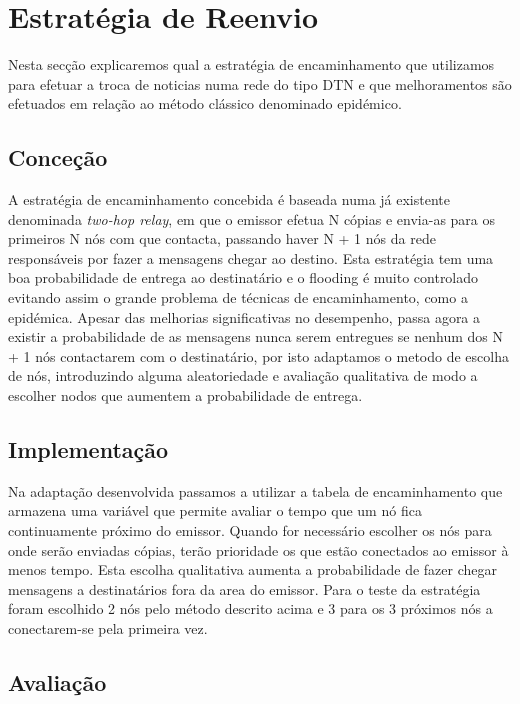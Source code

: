 \documentclass{llncs}
\begin{document}
\section{Estratégia de Reenvio}

Nesta secção explicaremos qual a estratégia de encaminhamento que utilizamos para efetuar a troca de noticias numa rede do tipo DTN e que melhoramentos são efetuados em relação ao método clássico denominado epidémico.

\subsection{Conceção}

A estratégia de encaminhamento concebida é baseada numa já existente denominada \emph{two-hop relay}, em que o emissor efetua N cópias e envia-as para os primeiros N nós com que contacta, passando haver N + 1 nós da rede responsáveis por fazer a mensagens chegar ao destino. Esta estratégia tem uma boa probabilidade de entrega ao destinatário e o flooding é muito controlado evitando assim o grande problema de técnicas de encaminhamento, como a epidémica. Apesar das melhorias significativas no desempenho, passa agora a existir a probabilidade de as mensagens nunca serem entregues se nenhum dos N + 1 nós contactarem com o destinatário, por isto adaptamos o metodo de escolha de nós, introduzindo alguma aleatoriedade e avaliação qualitativa de modo a escolher nodos que aumentem a probabilidade de entrega.

\subsection{Implementação}

Na adaptação desenvolvida passamos a utilizar a tabela de encaminhamento que armazena uma variável que permite avaliar o tempo que um nó fica continuamente próximo do emissor. Quando for necessário escolher os nós para onde serão enviadas cópias, terão prioridade os que estão conectados ao emissor à menos tempo. Esta escolha qualitativa aumenta a probabilidade de fazer chegar mensagens a destinatários fora da area do emissor. Para o teste da estratégia foram escolhido 2 nós pelo método descrito acima e 3 para os 3 próximos nós a conectarem-se pela primeira vez.

\subsection{Avaliação}
\end{document}
